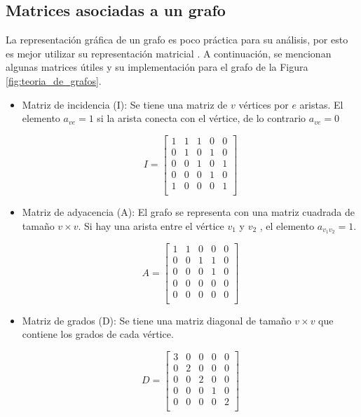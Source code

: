 \subsection{Matrices asociadas a un grafo}
La representación gráfica de un grafo es poco práctica para su análisis, por esto es mejor utilizar su representación matricial \cite{FrancoF_2016_trabajo_fin_de_grado}. A continuación, se mencionan algunas matrices útiles y su implementación para el grafo de la Figura \ref{fig:teoria_de_grafos}.


\begin{itemize}
	\item Matriz de incidencia (I): Se tiene una matriz de $v$ vértices por $e$ aristas. El elemento $a_{ve} = 1 $ si la arista conecta con el vértice, de lo contrario $a_{ve} = 0$
	
	\[
	I = 
	\left[\begin{array}{ccccc}
		1 & 1 & 1 & 0 & 0 \\
		0 & 1 & 0 & 1 & 0 \\
		0 & 0 & 1 & 0 & 1 \\
		0 & 0 & 0 & 1 & 0 \\
		1 & 0 & 0 & 0 & 1 \\
	\end{array} \right]
	\]
	
	\item Matriz de adyacencia (A): El grafo se representa con una matriz cuadrada de tamaño $v \times v$. Si hay una arista entre el vértice $v_1$ y $v_2$ , el elemento $a_{v_1 v_2} = 1$.
	
	\[
	A = 
	\left[\begin{array}{ccccc}
		1 & 1 & 0 & 0 & 0 \\
		0 & 0 & 1 & 1 & 0 \\
		0 & 0 & 0 & 1 & 0 \\
		0 & 0 & 0 & 0 & 0 \\
		0 & 0 & 0 & 0 & 0 \\
	\end{array} \right]
	\]
	
	\item Matriz de grados (D): Se tiene una matriz diagonal de tamaño $v \times v$ que contiene los grados de cada vértice. 
	
	\[
	D = 
	\left[\begin{array}{ccccc}
		3 & 0 & 0 & 0 & 0 \\
		0 & 2 & 0 & 0 & 0 \\
		0 & 0 & 2 & 0 & 0 \\
		0 & 0 & 0 & 1 & 0 \\
		0 & 0 & 0 & 0 & 2 \\
	\end{array} \right]
	\]
	

\end{itemize}
